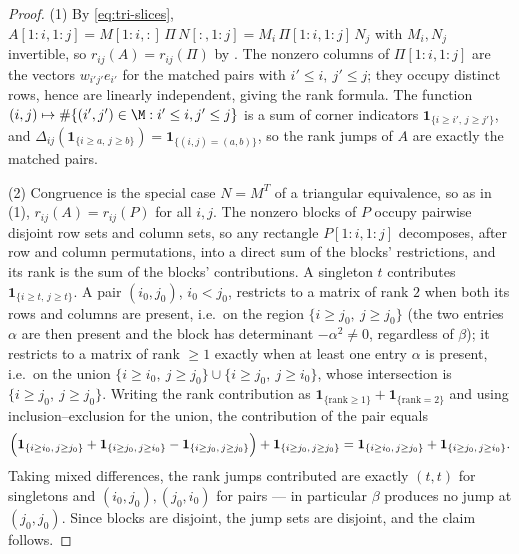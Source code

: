 \begin{proof}
  (1) By \cref{eq:tri-slices},
  $A[1:i,1:j] = M[1:i,:] \, \Pi \, N[:,1:j] = M_i \, \Pi[1:i,1:j] \, N_j$
  with $M_i, N_j$ invertible, so $r_{ij}(A) = r_{ij}(\Pi)$ by
  .  The nonzero columns of $\Pi[1:i,1:j]$ are
  the vectors $w_{i'j'} e_{i'}$ for the matched pairs with
  $i' \le i,\ j' \le j$; they occupy distinct rows, hence are linearly
  independent, giving the rank formula.  The function
  $(i,j) \mapsto \#\{(i',j') \in \M : i' \le i, j' \le j\}$ is a sum of
  corner indicators $\mathbf{1}_{\{i \ge i',\, j \ge j'\}}$, and
  $\Delta_{ij}(\mathbf{1}_{\{i \ge a,\, j \ge b\}}) = \mathbf{1}_{\{(i,j) =
  (a,b)\}}$, so the rank jumps of $A$ are exactly the matched pairs.

  (2) Congruence is the special case $N = M^T$ of a triangular
  equivalence, so as in (1), $r_{ij}(A) = r_{ij}(P)$ for all $i,j$.  The
  nonzero blocks of $P$ occupy pairwise disjoint row sets and column sets,
  so any rectangle $P[1:i,1:j]$ decomposes, after row and column
  permutations, into a direct sum of the blocks' restrictions, and its rank
  is the sum of the blocks' contributions.  A singleton $t$ contributes
  $\mathbf{1}_{\{i \ge t,\, j \ge t\}}$.  A pair $(i_0, j_0)$, $i_0 < j_0$,
  restricts to a matrix of rank $2$ when both its rows and columns are
  present, i.e.\ on the region $\{i \ge j_0,\ j \ge j_0\}$ (the two entries
  $\alpha$ are then present and the block has determinant
  $-\alpha^2 \neq 0$, regardless of $\beta$); it restricts to a matrix of
  rank $\ge 1$ exactly when at least one entry $\alpha$ is present, i.e.\ on
  the union $\{i \ge i_0,\ j \ge j_0\} \cup \{i \ge j_0,\ j \ge i_0\}$,
  whose intersection is $\{i \ge j_0,\ j \ge j_0\}$.  Writing the rank
  contribution as
  $\mathbf{1}_{\{\text{rank} \ge 1\}} + \mathbf{1}_{\{\text{rank} = 2\}}$
  and using inclusion--exclusion for the union, the contribution of the pair
  equals
  \[
    \Bigl(
    \mathbf{1}_{\{i \ge i_0,\, j \ge j_0\}}
    + \mathbf{1}_{\{i \ge j_0,\, j \ge i_0\}}
    - \mathbf{1}_{\{i \ge j_0,\, j \ge j_0\}}
    \Bigr)
    + \mathbf{1}_{\{i \ge j_0,\, j \ge j_0\}}
    =
    \mathbf{1}_{\{i \ge i_0,\, j \ge j_0\}}
    + \mathbf{1}_{\{i \ge j_0,\, j \ge i_0\}} .
  \]
  Taking mixed
  differences, the rank jumps contributed are exactly $(t,t)$ for
  singletons and $(i_0, j_0), (j_0, i_0)$ for pairs --- in particular
  $\beta$ produces no jump at $(j_0, j_0)$.  Since blocks are disjoint, the
  jump sets are disjoint, and the claim follows.
\end{proof}

